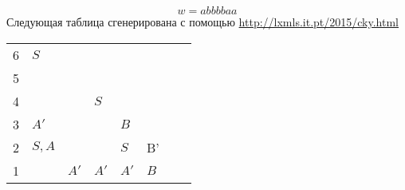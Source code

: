 \documentclass[12pt]{article}
\begin{document}
\begin{enumerate}
        \[
            w = abbbbaa
        \]
        Следующая таблица сгенерирована с помощью \url{http://lxmls.it.pt/2015/cky.html}
\begin{table}[h]
\begin{tabular}{llllllll}
\cline{2-8}
\multicolumn{1}{l|}{\cellcolor[HTML]{DAE8FC}6} & \multicolumn{1}{l|}{$S$}   & \multicolumn{1}{l|}{\cellcolor[HTML]{9B9B9B}} & \multicolumn{1}{l|}{\cellcolor[HTML]{9B9B9B}} & \multicolumn{1}{l|}{\cellcolor[HTML]{9B9B9B}} & \multicolumn{1}{l|}{\cellcolor[HTML]{9B9B9B}} & \multicolumn{1}{l|}{\cellcolor[HTML]{9B9B9B}} & \multicolumn{1}{l|}{\cellcolor[HTML]{9B9B9B}} \\ \cline{2-8} 
\multicolumn{1}{l|}{\cellcolor[HTML]{DAE8FC}5} & \multicolumn{1}{l|}{}      & \multicolumn{1}{l|}{}                         & \multicolumn{1}{l|}{\cellcolor[HTML]{9B9B9B}} & \multicolumn{1}{l|}{\cellcolor[HTML]{9B9B9B}} & \multicolumn{1}{l|}{\cellcolor[HTML]{9B9B9B}} & \multicolumn{1}{l|}{\cellcolor[HTML]{9B9B9B}} & \multicolumn{1}{l|}{\cellcolor[HTML]{9B9B9B}} \\ \cline{2-8} 
\multicolumn{1}{l|}{\cellcolor[HTML]{DAE8FC}4} & \multicolumn{1}{l|}{}      & \multicolumn{1}{l|}{}                         & \multicolumn{1}{l|}{$S$}                      & \multicolumn{1}{l|}{\cellcolor[HTML]{9B9B9B}} & \multicolumn{1}{l|}{\cellcolor[HTML]{9B9B9B}} & \multicolumn{1}{l|}{\cellcolor[HTML]{9B9B9B}} & \multicolumn{1}{l|}{\cellcolor[HTML]{9B9B9B}} \\ \cline{2-8} 
\multicolumn{1}{l|}{\cellcolor[HTML]{DAE8FC}3} & \multicolumn{1}{l|}{$A'$}  & \multicolumn{1}{l|}{}                         & \multicolumn{1}{l|}{}                         & \multicolumn{1}{l|}{$B$}                      & \multicolumn{1}{l|}{\cellcolor[HTML]{9B9B9B}} & \multicolumn{1}{l|}{\cellcolor[HTML]{9B9B9B}} & \multicolumn{1}{l|}{\cellcolor[HTML]{9B9B9B}} \\ \cline{2-8} 
\multicolumn{1}{l|}{\cellcolor[HTML]{DAE8FC}2} & \multicolumn{1}{l|}{$S,A$} & \multicolumn{1}{l|}{}                         & \multicolumn{1}{l|}{}                         & \multicolumn{1}{l|}{$S$}                      & \multicolumn{1}{l|}{B'}                       & \multicolumn{1}{l|}{\cellcolor[HTML]{9B9B9B}} & \multicolumn{1}{l|}{\cellcolor[HTML]{9B9B9B}} \\ \cline{2-8} 
\multicolumn{1}{l|}{\cellcolor[HTML]{DAE8FC}1} & \multicolumn{1}{l|}{}      & \multicolumn{1}{l|}{$A'$}                     & \multicolumn{1}{l|}{$A'$}                     & \multicolumn{1}{l|}{$A'$}                     & \multicolumn{1}{l|}{$B$}                      & \multicolumn{1}{l|}{\cellcolor[HTML]{FFFFFF}} & \multicolumn{1}{l|}{\cellcolor[HTML]{9B9B9B}} \\ \cline{2-8} 

\end{tabular}
\end{table}
\end{enumerate}
\end{document}
